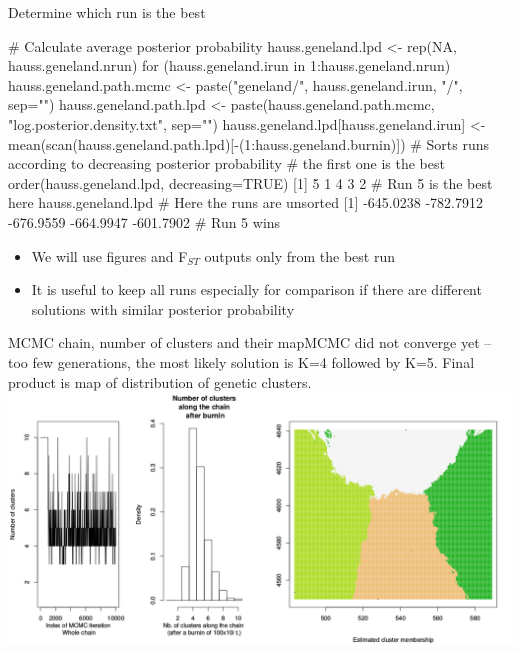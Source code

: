 \documentclass[compress, ucs, xelatex, 11pt, xcolor=svgnames,
  hyperref={
    bookmarks=true,
    unicode=true,
    colorlinks=true,
    pdftitle={Molecular data in R},
    plainpages=false,
    pdfauthor={Vojtech Zeisek},
    pdfsubject={Course about phylogeny and evolution in R},
    pdfcreator={XeLaTeX},
    pdfkeywords={R, evolution, phylogeny, molecular data},
    linkcolor=Tomato,
    anchorcolor=SaddleBrown,
    citecolor=Goldenrod,
    filecolor=DarkMagenta,
    menucolor=Sienna,
    urlcolor=DarkTurquoise,
    pdftex},
  url={hyphens, lowtilde} %
  ]{beamer}
\begin{document}
\begin{frame}[fragile]{Determine which run is the best}
  \begin{spluscode}
    # Calculate average posterior probability
    hauss.geneland.lpd <- rep(NA, hauss.geneland.nrun)
    for (hauss.geneland.irun in 1:hauss.geneland.nrun) {
      hauss.geneland.path.mcmc <- paste("geneland/",
        hauss.geneland.irun, "/", sep="")
      hauss.geneland.path.lpd <- paste(hauss.geneland.path.mcmc,
        "log.posterior.density.txt", sep="")
      hauss.geneland.lpd[hauss.geneland.irun] <- 
        mean(scan(hauss.geneland.path.lpd)[-(1:hauss.geneland.burnin)]) }
    # Sorts runs according to decreasing posterior probability
    # the first one is the best
    order(hauss.geneland.lpd, decreasing=TRUE)
    [1] 5 1 4 3 2 # Run 5 is the best here
    hauss.geneland.lpd # Here the runs are unsorted
    [1] -645.0238 -782.7912 -676.9559 -664.9947 -601.7902 # Run 5 wins
  \end{spluscode}
  \begin{itemize}
    \item We will use figures and F$_{ST}$ outputs only from the best run
    \item It is useful to keep all runs especially for comparison if there are different solutions with similar posterior probability
  \end{itemize}
\end{frame}

\begin{frame}{MCMC chain, number of clusters and their map}{MCMC did not converge yet -- too few generations, the most likely solution is K=4 followed by K=5. Final product is map of distribution of genetic clusters.}
  \includegraphics[width=\textwidth]{geneland1.png}
\end{frame}
\end{document}
